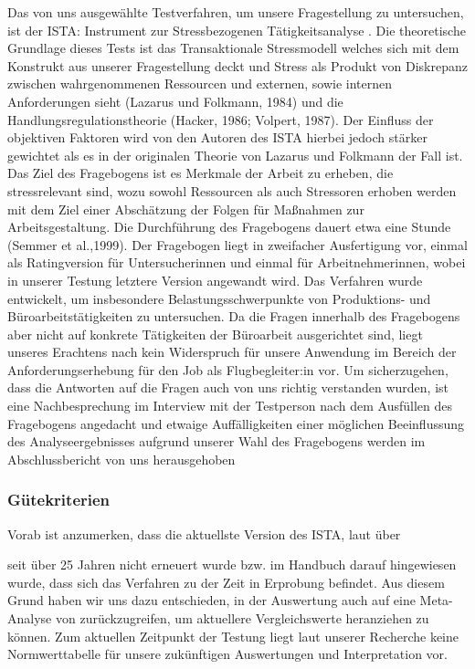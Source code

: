 \documentclass[12pt, a4paper]{article}
\begin{document}
Das von uns ausgewählte Testverfahren, um unsere Fragestellung zu untersuchen, 
ist der ISTA: Instrument zur Stressbezogenen Tätigkeitsanalyse 
\parencite{semmerISTAInstrumentZur1998}. 
Die theoretische Grundlage dieses Tests ist das Transaktionale Stressmodell 
welches sich mit dem Konstrukt aus unserer Fragestellung deckt und Stress
als Produkt von Diskrepanz zwischen wahrgenommenen Ressourcen und externen, 
sowie internen Anforderungen sieht (Lazarus und  Folkmann, 1984) 
und die Handlungsregulationstheorie (Hacker, 1986; Volpert,
1987). 
Der Einfluss der objektiven Faktoren wird von den Autoren des ISTA hierbei jedoch
stärker gewichtet als es in der originalen Theorie von Lazarus und Folkmann der Fall ist.
Das Ziel des Fragebogens ist es Merkmale der Arbeit zu erheben, die stressrelevant sind,
wozu sowohl Ressourcen als auch Stressoren erhoben werden mit dem Ziel einer
Abschätzung der Folgen für Maßnahmen zur Arbeitsgestaltung. Die Durchführung des
Fragebogens dauert etwa eine Stunde (Semmer et al.,1999).
Der Fragebogen liegt in zweifacher Ausfertigung vor, einmal als Ratingversion für
Untersucherinnen und einmal für Arbeitnehmerinnen, wobei in unserer Testung letztere
Version angewandt wird. Das Verfahren wurde entwickelt, um insbesondere
Belastungsschwerpunkte von Produktions- und Büroarbeitstätigkeiten zu untersuchen. Da
die Fragen innerhalb des Fragebogens aber nicht auf konkrete Tätigkeiten der Büroarbeit
ausgerichtet sind, liegt unseres Erachtens nach kein Widerspruch für unsere Anwendung im
Bereich der Anforderungserhebung für den Job als Flugbegleiter:in vor. Um sicherzugehen,
dass die Antworten auf die Fragen auch von uns richtig verstanden wurden, ist eine
Nachbesprechung im Interview mit der Testperson nach dem Ausfüllen des Fragebogens
angedacht und etwaige Auffälligkeiten einer möglichen Beeinflussung des
Analyseergebnisses aufgrund unserer Wahl des Fragebogens werden im Abschlussbericht
von uns herausgehoben

\subsubsection{Gütekriterien}

Vorab ist anzumerken, dass die aktuellste Version des ISTA, laut über 

seit über 25 Jahren nicht
erneuert wurde bzw. im Handbuch darauf hingewiesen wurde, dass sich das Verfahren zu
der Zeit in Erprobung befindet. Aus diesem Grund haben wir uns dazu entschieden, in der
Auswertung auch auf eine Meta-Analyse von \textcite{irmerInstrumentStressOrientedTask2019}
zurückzugreifen, um aktuellere Vergleichswerte heranziehen zu können. 
Zum aktuellen Zeitpunkt der Testung liegt laut unserer Recherche keine Normwerttabelle 
für unsere zukünftigen Auswertungen und Interpretation vor.
\end{document}

